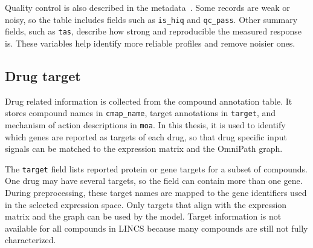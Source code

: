 \noindent Quality control is also described in the metadata~\cite{l1000_paper}. Some records are weak or noisy, so the table includes fields such as \texttt{is\_hiq} and \texttt{qc\_pass}. Other summary fields, such as \texttt{tas}, describe how strong and reproducible the measured response is. These variables help identify more reliable profiles and remove noisier ones.


\subsection{Drug target}
\noindent Drug related information is collected from the compound annotation table. It stores compound names in \texttt{cmap\_name}, target annotations in \texttt{target}, and mechanism of action descriptions in \texttt{moa}. In this thesis, it is used to identify which genes are reported as targets of each drug, so that drug specific input signals can be matched to the expression matrix and the OmniPath graph.

\noindent The \texttt{target} field lists reported protein or gene targets for a subset of compounds. One drug may have several targets, so the field can contain more than one gene. During preprocessing, these target names are mapped to the gene identifiers used in the selected expression space. Only targets that align with the expression matrix and the graph can be used by the model. Target information is not available for all compounds in LINCS because many compounds are still not fully characterized.


